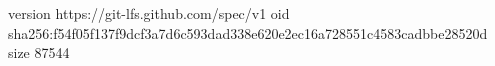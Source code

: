version https://git-lfs.github.com/spec/v1
oid sha256:f54f05f137f9dcf3a7d6c593dad338e620e2ec16a728551c4583cadbbe28520d
size 87544
